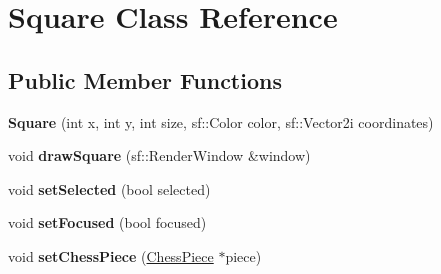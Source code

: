 \hypertarget{class_square}{}\section{Square Class Reference}
\label{class_square}
\subsection*{Public Member Functions}
\begin{DoxyCompactItemize}
\item 
\mbox{\label{class_square_a4bf015855b3e86e9385d3e026c0daafa}} 
{\bfseries Square} (int x, int y, int size, sf\+::\+Color color, sf\+::\+Vector2i coordinates)
\item 
\mbox{\label{class_square_acdae90087b11bb963f79171ad9d5d5d1}} 
void {\bfseries draw\+Square} (sf\+::\+Render\+Window \&window)
\item 
\mbox{\label{class_square_a662df4d28ccded0e1f37f0d9adac2620}} 
void {\bfseries set\+Selected} (bool selected)
\item 
\mbox{\label{class_square_aca3e74cb55eab03037fc2e234b395bcf}} 
void {\bfseries set\+Focused} (bool focused)
\item 
\mbox{\label{class_square_aa2eaed70acdcd0c0dd882732ff43ede3}} 
void {\bfseries set\+Chess\+Piece} (\mbox{\hyperlink{class_chess_piece}{Chess\+Piece}} $\ast$piece)
\end{DoxyCompactItemize}
